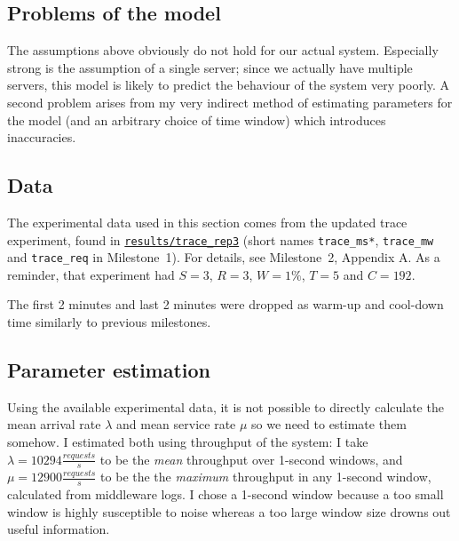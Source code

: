 \documentclass[11pt]{article}
\begin{document}
\subsection{Problems of the model}
The assumptions above obviously do not hold for our actual system. Especially strong is the assumption of a single server; since we actually have multiple servers, this model is likely to predict the behaviour of the system very poorly. A second problem arises from my very indirect method of estimating parameters for the model (and an arbitrary choice of time window) which introduces inaccuracies.


\subsection{Data}

The experimental data used in this section comes from the updated trace experiment, found in \texttt{\href{https://gitlab.inf.ethz.ch/pungast/asl-fall16-project/tree/master/results/trace\_rep3}{results/trace\_rep3}} (short names \texttt{trace\_ms*}, \texttt{trace\_mw} and \texttt{trace\_req} in Milestone~1). For details, see Milestone~2, Appendix A. As a reminder, that experiment had $S=3$, $R=3$, $W=1\%$, $T=5$ and $C=192$.

The first 2 minutes and last 2 minutes were dropped as warm-up and cool-down time similarly to previous milestones.
 
\subsection{Parameter estimation}

Using the available experimental data, it is not possible to directly calculate the mean arrival rate $\lambda$ and mean service rate $\mu$ so we need to estimate them somehow. I estimated both using throughput of the system: I take $\lambda = 10294 \frac{requests}{s}$ to be the \emph{mean} throughput over 1-second windows, and $\mu = 12900 \frac{requests}{s}$ to be the the \emph{maximum} throughput in any 1-second window, calculated from middleware logs. I chose a 1-second window because a too small window is highly susceptible to noise whereas a too large window size drowns out useful information.

\end{document}
